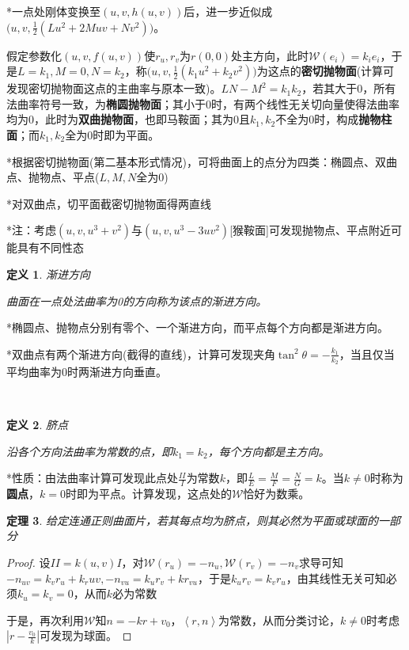 \documentclass[a4paper,UTF8,fontset=windows]{ctexart}
\newtheorem{thm}{定理}[section]
\newtheorem{dfn}[thm]{定义}
\begin{document}
*一点处刚体变换至$(u,v,h(u,v))$后，进一步近似成$\big(u,v,\frac{1}{2}(Lu^2+2Muv+Nv^2)\big)$。

假定参数化$(u,v,f(u,v))$使$r_u,r_v$为$r(0,0)$处主方向，此时$\mathcal{W}(e_i)=k_ie_i$，于是$L=k_1,M=0,N=k_2$，称$\big(u,v,\frac{1}{2}(k_1u^2+k_2v^2)\big)$为这点的\textbf{密切抛物面}(计算可发现密切抛物面这点的主曲率与原本一致)。$LN-M^2=k_1k_2$，若其大于0，所有法曲率符号一致，为\textbf{椭圆抛物面}；其小于0时，有两个线性无关切向量使得法曲率均为0，此时为\textbf{双曲抛物面}，也即马鞍面；其为0且$k_1,k_2$不全为0时，构成\textbf{抛物柱面}；而$k_1,k_2$全为0时即为平面。

*根据密切抛物面(第二基本形式情况)，可将曲面上的点分为四类：椭圆点、双曲点、抛物点、平点($L,M,N$全为0)

*对双曲点，切平面截密切抛物面得两直线

*注：考虑$(u,v,u^3+v^2)$与$(u,v,u^3-3uv^2)$[猴鞍面]可发现抛物点、平点附近可能具有不同性态

\begin{dfn} 渐进方向

曲面在一点处法曲率为0的方向称为该点的渐进方向。
\end{dfn}

*椭圆点、抛物点分别有零个、一个渐进方向，而平点每个方向都是渐进方向。

*双曲点有两个渐进方向(截得的直线)，计算可发现夹角$\tan^2\theta=-\frac{k_1}{k_2}$，当且仅当平均曲率为0时两渐进方向垂直。

\

\begin{dfn} 脐点

沿各个方向法曲率为常数的点，即$k_1=k_2$，每个方向都是主方向。
\end{dfn}

*性质：由法曲率计算可发现此点处$\frac{II}{I}$为常数$k$，即$\frac{L}{E}=\frac{M}{F}=\frac{N}{G}=k$。当$k\ne0$时称为\textbf{圆点}，$k=0$时即为平点。计算发现，这点处的$\mathcal{W}$恰好为数乘。

\begin{thm}
给定连通正则曲面片，若其每点均为脐点，则其必然为平面或球面的一部分
\end{thm}

\begin{proof}
设$II=k(u,v)I$，对$\mathcal{W}(r_u)=-n_u,\mathcal{W}(r_v)=-n_v$求导可知$-n_{uv}=k_vr_u+k_r{uv},-n_{vu}=k_ur_v+kr_{vu}$，于是$k_ur_v=k_vr_u$，由其线性无关可知必须$k_u=k_v=0$，从而$k$必为常数

于是，再次利用$\mathcal{W}$知$n=-kr+v_0$，$\left<r,n\right>$为常数，从而分类讨论，$k\ne0$时考虑$|r-\frac{v_0}{k}|$可发现为球面。
\end{proof}
\end{document}
